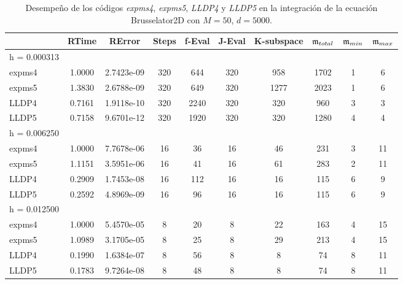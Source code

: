 \begin{table}[htb]
	\caption{Desempeño de los códigos \emph{expms4}, \emph{expms5}, \emph{LLDP4} y \emph{LLDP5} en la integración de la ecuación Brusselator2D con $M=50$, $d=5000$.}
	\centering
	\begin{tabular}{lccccccccc}
		\hline
		& RTime & RError & Steps & f-Eval & J-Eval & K-subspace & $\mathfrak{m}_{total}$ & $\mathfrak{m}_{min}$ & $\mathfrak{m}_{max}$ \\
		\hline
		h = 0.000313 &  &  &  &  &  &  &  &  &  \\
		expms4 & 1.0000 & 2.7423e-09 & 320 & 644 & 320 & 958 & 1702 & 1 & 6  \\
		expms5 & 1.3830 & 2.6788e-09 & 320 & 649 & 320 & 1277 & 2023 & 1 & 6  \\
		LLDP4 & 0.7161 & 1.9118e-10 & 320 & 2240 & 320 & 320 & 960 & 3 & 3  \\
		LLDP5 & 0.7158 & 9.6701e-12 & 320 & 1920 & 320 & 320 & 1280 & 4 & 4  \\
		\hline
		h = 0.006250 &  &  &  &  &  &  &  &  &  \\
		expms4 & 1.0000 & 7.7678e-06 & 16 & 36 & 16 & 46 & 231 & 3 & 11  \\
		expms5 & 1.1151 & 3.5951e-06 & 16 & 41 & 16 & 61 & 283 & 2 & 11  \\
		LLDP4 & 0.2909 & 1.7453e-08 & 16 & 112 & 16 & 16 & 115 & 6 & 9  \\
		LLDP5 & 0.2592 & 4.8969e-09 & 16 & 96 & 16 & 16 & 115 & 6 & 9  \\
		\hline
		h = 0.012500 &  &  &  &  &  &  &  &  &  \\
		expms4 & 1.0000 & 5.4570e-05 & 8 & 20 & 8 & 22 & 163 & 4 & 15  \\
		expms5 & 1.0989 & 3.1705e-05 & 8 & 25 & 8 & 29 & 213 & 4 & 15  \\
		LLDP4 & 0.1990 & 1.6384e-07 & 8 & 56 & 8 & 8 & 74 & 8 & 11  \\
		LLDP5 & 0.1783 & 9.7264e-08 & 8 & 48 & 8 & 8 & 74 & 8 & 11  \\
		\hline
	\end{tabular}
	\label{tab:num-exp-lldp-fix-step:br2dna}
\end{table}

